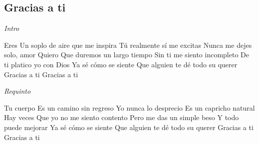 \subsection{Gracias a ti}
\noindent

\vspace{1cm}

\begin{guitar}
	\begin{multicols}{2}
		\textit{Intro}
		\par

		Eres
		Un soplo de aire que me inspira
		Tú realmente sí me excitas
		Nunca me dejes solo, amor
		Quiero
		Que duremos un largo tiempo
		Sin ti me siento incompleto
		De ti platico yo con Dios
		Ya sé cómo se siente
		Que alguien te dé todo su querer
		Gracias a ti
		Gracias a ti

		\par
		\textit{Requinto}
		\par

		Tu cuerpo
		Es un camino sin regreso
		Yo nunca lo desprecio
		Es un capricho natural
		Hay veces
		Que yo no me siento contento
		Pero me das un simple beso
		Y todo puede mejorar
		Ya sé cómo se siente
		Que alguien te dé todo su querer
		Gracias a ti
		Gracias a ti
	\end{multicols}
\end{guitar}
